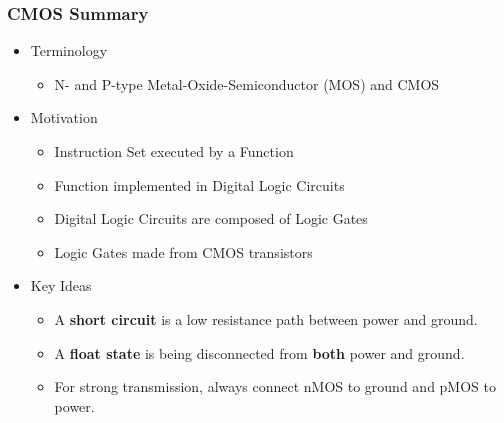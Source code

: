 
\begin{frame}\frametitle{CMOS Summary}
\begin{itemize}
    \item Terminology
    \begin{itemize}
    \item N- and P-type Metal-Oxide-Semiconductor (MOS) and CMOS
    \end{itemize}
\item Motivation
    \begin{itemize}
    \item Instruction Set executed by a Function
     \item Function implemented in Digital Logic Circuits
     \item Digital Logic Circuits are composed of Logic Gates
    \item Logic Gates made from CMOS transistors
    \end{itemize}
\item Key Ideas
\begin{itemize}
    \item A \textbf{short circuit} is a low resistance path between power and ground.
    \item A \textbf{float state} is being disconnected from \textbf{both} power and ground.
\item For strong transmission, always connect nMOS to ground and pMOS to power.
\end{itemize}

\end{itemize}
 \end{frame}
